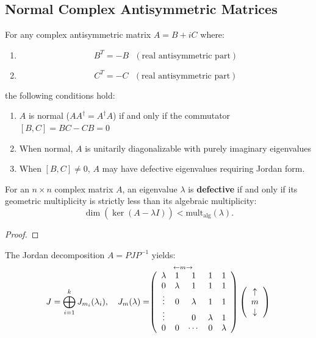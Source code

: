 \subsection{Normal Complex Antisymmetric Matrices}

\begin{theorem}
For any complex antisymmetric matrix $A=B+iC$ where:

\begin{enumerate}
\item 
\begin{equation}
B^{T}=-B\text{ }(\text{real antisymmetric part})
\end{equation}

\item 
\begin{equation}
C^{T}=-C\text{ }(\text{real antisymmetric part})
\end{equation}
\end{enumerate}

the following conditions hold:

\begin{enumerate}
\item $A$ is normal ($AA^{\dagger }=A^{\dagger }A$) if and only if the
commutator $[B,C]=BC-CB=0$

\item When normal, $A$ is unitarily diagonalizable with purely imaginary
eigenvalues

\item When $[B,C]\neq 0$, $A$ may have defective eigenvalues requiring
Jordan form.
\end{enumerate}
\end{theorem}

\begin{theorem}
For an $n\times n$ complex matrix $A$, an eigenvalue $\lambda $ is {\bf %
defective} if and only if its geometric multiplicity is strictly less than
its algebraic multiplicity: 
\[
\dim \left( \stackrel{}{\ker (A-\lambda I)}\right) <\text{mult}_{\text{alg}%
}(\lambda ). 
\]

\begin{proof}
\end{proof}
\end{theorem}

The Jordan decomposition $A=PJP^{-1}$ yields:%
\begin{equation}
J=\bigoplus_{i=1}^{k}J_{m_{i}}(\lambda _{i}),\quad J_{m}(\lambda )=\stackrel{%
{\LARGE \leftarrow m\rightarrow \qquad \qquad }}{\left( 
\begin{array}{ccccc}
\lambda & 1 & 1 & 1 & 1 \\ 
0 & \lambda & 1 & 1 & 1 \\ 
\vdots & 0 & \lambda & 1 & 1 \\ 
\vdots &  & 0 & \lambda & 1 \\ 
0 & 0 & \cdots & 0 & \lambda%
\end{array}%
\right) \left( 
\begin{array}{c}
\uparrow \\ 
m \\ 
\downarrow%
\end{array}%
\right) }
\end{equation}

